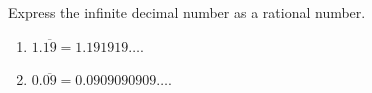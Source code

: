 Express the infinite decimal number as a rational number.
\begin{multicols}{2}
\begin{enumerate}
\item $1.\overline{19}=1.191919\dots$.
\item $0.\overline{09}=0.0909090909\dots $.
\end{enumerate}
\end{multicols}